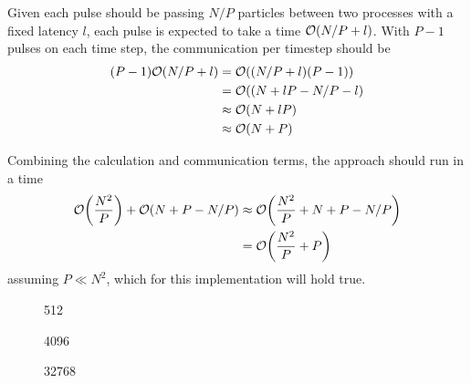 %
Given each pulse should be passing $N/P$ particles between two processes
with a fixed latency $l$, each pulse is expected to take a time
$\mathcal{O}{\left({ N/P + l }\right)}$.
%
With $P-1$ pulses on each time step, the communication per timestep should be
\begin{equation}
    \begin{split}
        (P-1)\mathcal{O}{\left({ N/P + l }\right)}
            &= \mathcal{O}{\left({ (N/P + l)(P-1) }\right)} \\
            &= \mathcal{O}{\left({ (N + lP - N/P - l }\right)} \\
            &\approx{} \mathcal{O}{\left({ N + lP }\right)} \\
            &\approx{} \mathcal{O}{\left({ N + P }\right)}
    \end{split}
\end{equation}

%
Combining the calculation and communication terms, the \systolicloop{} approach
should run in a time
\begin{equation}
    \begin{split}
        \mathcal{O}{\left({ \frac{N^2}{P} }\right)} + \mathcal{O}{\left({ N + P - N/P }\right)}
            &\approx{} \mathcal{O}{\left({ \frac{N^2}{P} + N + P - N/P }\right)} \\
            &= \mathcal{O}{\left({ \frac{N^2}{P} + P }\right)}
    \end{split}
\end{equation}
assuming $P \ll{} N^2$, which for this implementation will hold true.


%
%
\begin{figure}[!h]
    
    \caption{
        \vZeroTimeCaption
            {\systolicloop{}}
            {\pairoperation{}}
            {512}
    }
    \label{fig:v0_systolic_pair_operation_512_logtime}
\end  {figure}

\begin{figure}[!h]
    
    \caption{
        \vZeroTimeCaption
        {\systolicloop{}}
        {\pairoperation{}}
        {4096}
    }
    \label{fig:v0_systolic_pair_operation_4096_logtime}
\end  {figure}

\begin{figure}[!h]
    
    \caption{
        \vZeroTimeCaption
            {\systolicloop{}}
            {\pairoperation{}}
            {32768}
    }
    \label{fig:v0_systolic_pair_operation_32768_logtime}
\end  {figure}

